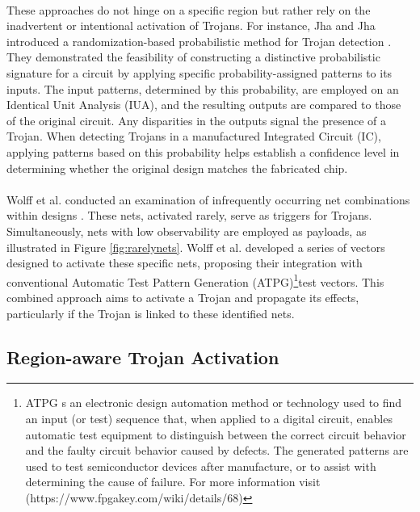 \paragraph*{}
These approaches do not hinge on a specific region but rather rely on the inadvertent or intentional activation of Trojans. For instance, Jha and Jha introduced a randomization-based probabilistic method for Trojan detection \cite{jha2008randomization}. They demonstrated the feasibility of constructing a distinctive probabilistic signature for a circuit by applying specific probability-assigned patterns to its inputs. The input patterns, determined by this probability, are employed on an Identical Unit Analysis (IUA), and the resulting outputs are compared to those of the original circuit. Any disparities in the outputs signal the presence of a Trojan. When detecting Trojans in a manufactured Integrated Circuit (IC), applying patterns based on this probability helps establish a confidence level in determining whether the original design matches the fabricated chip.
\paragraph*{}
Wolff et al. conducted an examination of infrequently occurring net combinations within designs \cite{wolff2008towards}. These nets, activated rarely, serve as triggers for Trojans. Simultaneously, nets with low observability are employed as payloads, as illustrated in Figure \ref{fig:rarelynets}. Wolff et al. developed a series of vectors designed to activate these specific nets, proposing their integration with conventional Automatic Test Pattern Generation (ATPG)\footnote{ATPG s an electronic design automation method or technology used to find an input (or test) sequence that, when applied to a digital circuit, enables automatic test equipment to distinguish between the correct circuit behavior and the faulty circuit behavior caused by defects. The generated patterns are used to test semiconductor devices after manufacture, or to assist with determining the cause of failure. For more information visit (https://www.fpgakey.com/wiki/details/68)}test vectors. This combined approach aims to activate a Trojan and propagate its effects, particularly if the Trojan is linked to these identified nets.

\subsection{Region-aware Trojan Activation}
